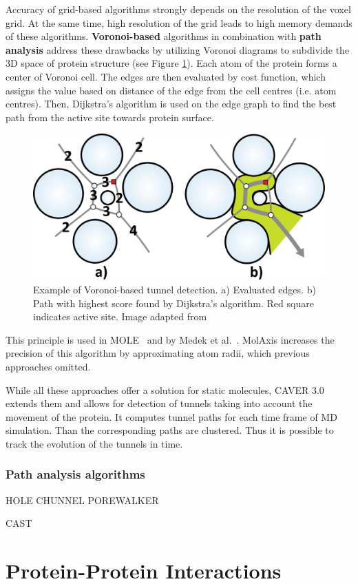 Accuracy of grid-based algorithms strongly depends on the resolution of the voxel grid. At the same time, high resolution of the grid leads to high memory demands of these algorithms. \textbf{Voronoi-based} algorithms in combination with \textbf{path analysis} address these drawbacks by utilizing Voronoi diagrams to subdivide the 3D space of protein structure (see Figure \ref{Fig:voronoi}). Each atom of the protein forms a center of Voronoi cell. The edges are then evaluated by cost function, which assigns the value based on distance of the edge from the cell centres (i.e. atom centres). Then, Dijkstra's algorithm is used on the edge graph to find the best path from the active site towards protein surface. 

\begin{figure}[H]
  \centering
  \includegraphics[width=0.7\linewidth]{pictures/voronoi.pdf} 
  \caption{Example of Voronoi-based tunnel detection. a) Evaluated edges. b) Path with highest score found by Dijkstra's algorithm. Red square indicates active site. Image adapted from \cite{caver20}}
  \label{Fig:voronoi}  
\end{figure} 

This principle is used in MOLE~\cite{Petrek2007MOLE} and by Medek et al.~\cite{caver20}. MolAxis \cite{Yaffe2008MolAxis} increases the precision of this algorithm by approximating atom radii, which previous approaches omitted.

While all these approaches offer a solution for static molecules, CAVER 3.0~\cite{caver30} extends them and allows for detection of tunnels taking into account the movement of the protein. It computes tunnel paths for each time frame of MD simulation. Than the corresponding paths are clustered. Thus it is possible to track the evolution of the tunnels in time.

\subsubsection{Path analysis algorithms}
HOLE \cite{Smart1996Hole}
CHUNNEL \cite{Coleman2009CHUNNEL}
POREWALKER \cite{Pellegrini2009PoreWalker}
 




CAST \cite{liang1998anatomy}



\section{Protein-Protein Interactions}
